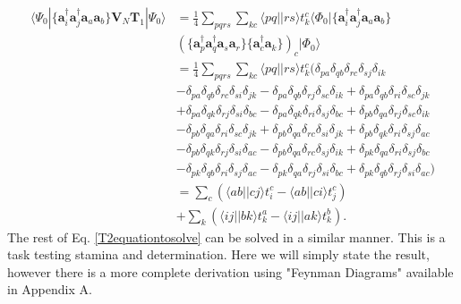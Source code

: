\begin{align}
\langle \Psi_{0} | \{\textbf{a}^{\dag}_i \textbf{a}^{\dag}_j \textbf{a}_a \textbf{a}_b\}  \textbf{V}_N \textbf{T}_1 | \Psi_0 \rangle & = 
\frac{1}{4}
\sum_{pqrs}
\sum_{kc}
\langle pq|| rs \rangle t_k^c \langle \Phi_0 | \{
\textbf{a}^{\dag}_i
\textbf{a}^{\dag}_j
\textbf{a}_a
\textbf{a}_b \} \nonumber \\ & 
\left(
\{
\textbf{a}^{\dag}_p
\textbf{a}^{\dag}_q
\textbf{a}_s
\textbf{a}_r
\}
\{
\textbf{a}^{\dag}_c
\textbf{a}_k
\}
\right)_c | \Phi_0 \rangle
\nonumber \\ & = 
\frac{1}{4} \sum_{pqrs} \sum_{kc} \langle pq||rs\rangle t_k^c ( \delta_{pa} \delta_{qb} \delta_{rc} \delta_{sj} \delta_{ik}  \nonumber \\ & 
- \delta_{pa} \delta_{qb} \delta_{rc} \delta_{si} \delta_{jk}
- \delta_{pa} \delta_{qb} \delta_{rj} \delta_{sc} \delta_{ik}
+ \delta_{pa} \delta_{qb} \delta_{ri} \delta_{sc} \delta_{jk}
\nonumber \\ & 
+ \delta_{pa} \delta_{qk} \delta_{rj} \delta_{si} \delta_{bc}
- \delta_{pa} \delta_{qk} \delta_{ri} \delta_{sj} \delta_{bc}
+ \delta_{pb} \delta_{qa} \delta_{rj} \delta_{sc} \delta_{ik}
 \nonumber \\ & 
- \delta_{pb} \delta_{qa} \delta_{ri} \delta_{sc} \delta_{jk}
+ \delta_{pb} \delta_{qa} \delta_{rc} \delta_{si} \delta_{jk} 
+ \delta_{pb} \delta_{qk} \delta_{ri} \delta_{sj} \delta_{ac} \nonumber \\ & 
- \delta_{pb} \delta_{qk} \delta_{rj} \delta_{si} \delta_{ac}
- \delta_{pb} \delta_{qa} \delta_{rc} \delta_{sj} \delta_{ik}
+ \delta_{pk} \delta_{qa} \delta_{ri} \delta_{sj} \delta_{bc} \nonumber \\ & 
- \delta_{pk} \delta_{qb} \delta_{ri} \delta_{sj} \delta_{ac}
- \delta_{pk} \delta_{qa} \delta_{rj} \delta_{si} \delta_{bc}
+ \delta_{pk} \delta_{qb} \delta_{rj} \delta_{si} \delta_{ac}) \nonumber \\ &
= \sum_c \left( \langle ab || cj \rangle t_i^c - \langle ab || ci \rangle t_j^c \right) \nonumber \\ & 
+ \sum_k \left( \langle ij || bk \rangle t_k^a - \langle ij||ak\rangle t_k^b \right) .
\end{align}
The rest of Eq. \eqref{T2equationtosolve} can be solved in a similar manner. This is a task testing stamina and determination. Here we will simply state the result, however there is a more complete derivation using "Feynman Diagrams" available in Appendix A. \\

